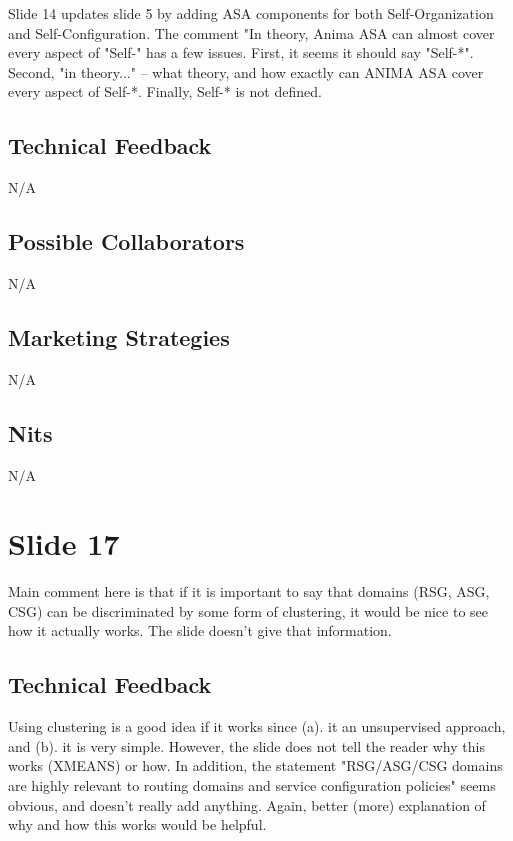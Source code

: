 \documentclass[11pt, oneside]{article}   	%
\begin{document}
Slide 14 updates slide 5 by adding ASA components for both Self-Organization and Self-Configuration. The comment "In theory, Anima ASA can almost cover every aspect of "Self-"
has a few issues. First, it seems it should say "Self-*". Second, "in theory..." -- what theory, and how exactly can ANIMA ASA cover every aspect of Self-*. Finally,  Self-* is not
defined.

\subsection{Technical Feedback}
\label{slide7:technical_feedback}
N/A

\subsection{Possible Collaborators}
\label{slide7:possible_collaborators}
N/A

\subsection{Marketing Strategies}
\label{slide7:marketing_strategies}
N/A

\subsection{Nits}
\label{slide7:nits}

N/A

\section{Slide 17}
\label{sec:slide17}

Main comment here is that if it is important to say that domains (RSG, ASG, CSG) can be discriminated by some form of clustering, it would be nice to see 
how it actually works. The slide doesn't give that information. 

\subsection{Technical Feedback}
\label{slide17:technical_feedback}
Using clustering is a good idea if it works since (a). it an unsupervised approach, and (b). it is very simple. However, the slide does not tell the reader why
this works (XMEANS) or how. In addition, the statement "RSG/ASG/CSG domains are highly relevant to routing domains and service configuration policies" seems 
obvious, and doesn't really add anything. Again, better (more) explanation of why and how this works would be helpful.
\end{document}
